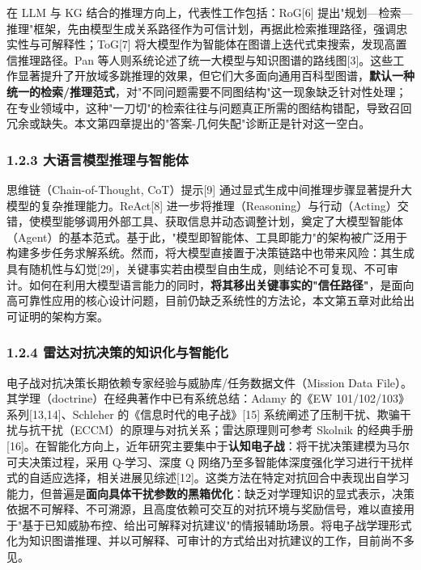 \documentclass[12pt,a4paper]{ctexart}
\begin{document}
在 LLM 与 KG 结合的推理方向上，代表性工作包括：RoG[6] 提出"规划—检索—推理"框架，先由模型生成关系路径作为可信计划，再据此检索推理路径，强调忠实性与可解释性；ToG[7] 将大模型作为智能体在图谱上迭代式束搜索，发现高置信推理路径。Pan 等人则系统论述了统一大模型与知识图谱的路线图[3]。这些工作显著提升了开放域多跳推理的效果，但它们大多面向通用百科型图谱，\textbf{默认一种统一的检索/推理范式}，对"不同问题需要不同图结构"这一现象缺乏针对性处理；在专业领域中，这种"一刀切"的检索往往与问题真正所需的图结构错配，导致召回冗余或缺失。本文第四章提出的"答案-几何失配"诊断正是针对这一空白。

\subsubsection*{1.2.3 大语言模型推理与智能体}

思维链（Chain-of-Thought, CoT）提示[9] 通过显式生成中间推理步骤显著提升大模型的复杂推理能力。ReAct[8] 进一步将推理（Reasoning）与行动（Acting）交错，使模型能够调用外部工具、获取信息并动态调整计划，奠定了大模型智能体（Agent）的基本范式。基于此，"模型即智能体、工具即能力"的架构被广泛用于构建多步任务求解系统。然而，将大模型直接置于决策链路中也带来风险：其生成具有随机性与幻觉[29]，关键事实若由模型自由生成，则结论不可复现、不可审计。如何在利用大模型语言能力的同时，\textbf{将其移出关键事实的"信任路径"}，是面向高可靠性应用的核心设计问题，目前仍缺乏系统性的方法论，本文第五章对此给出可证明的架构方案。

\subsubsection*{1.2.4 雷达对抗决策的知识化与智能化}

电子战对抗决策长期依赖专家经验与威胁库/任务数据文件（Mission Data File）。其学理（doctrine）在经典著作中已有系统总结：Adamy 的《EW 101/102/103》系列[13,14]、Schleher 的《信息时代的电子战》[15] 系统阐述了压制干扰、欺骗干扰与抗干扰（ECCM）的原理与对抗关系；雷达原理则可参考 Skolnik 的经典手册[16]。在智能化方向上，近年研究主要集中于\textbf{认知电子战}：将干扰决策建模为马尔可夫决策过程，采用 Q-学习、深度 Q 网络乃至多智能体深度强化学习进行干扰样式的自适应选择，相关进展见综述[12]。这类方法在特定对抗回合中表现出自学习能力，但普遍是\textbf{面向具体干扰参数的黑箱优化}：缺乏对学理知识的显式表示，决策依据不可解释、不可溯源，且高度依赖可交互的对抗环境与奖励信号，难以直接用于"基于已知威胁布控、给出可解释对抗建议"的情报辅助场景。将电子战学理形式化为知识图谱推理、并以可解释、可审计的方式给出对抗建议的工作，目前尚不多见。
\end{document}
